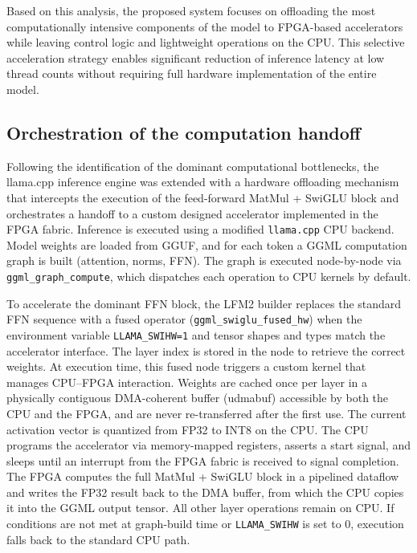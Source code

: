 \documentclass[manuscript,]{acmart} %
\begin{document}
Based on this analysis, the proposed system focuses on offloading the most computationally intensive components of the model to FPGA-based accelerators while leaving control logic and lightweight operations on the CPU. This selective acceleration strategy enables significant reduction of inference latency at low thread counts without requiring full hardware implementation of the entire model. 

\subsection{Orchestration of the computation handoff}
Following the identification of the dominant computational bottlenecks, the llama.cpp inference engine was extended with a hardware offloading mechanism that intercepts the execution of the feed-forward MatMul + SwiGLU block and orchestrates a handoff to a custom designed accelerator implemented in the FPGA fabric.
Inference is executed using a modified \texttt{llama.cpp} CPU backend. Model weights are loaded from GGUF, and for each token a GGML computation graph is built (attention, norms, FFN). The graph is executed node-by-node via \texttt{ggml\_graph\_compute}, which dispatches each operation to CPU kernels by default.

To accelerate the dominant FFN block, the LFM2 builder replaces the standard FFN sequence with a fused operator (\texttt{ggml\_swiglu\_fused\_hw}) when the environment variable \texttt{LLAMA\_SWIHW=1} and tensor shapes and types match the accelerator interface. The layer index is stored in the node to retrieve the correct weights.
At execution time, this fused node triggers a custom kernel that manages CPU–FPGA interaction. Weights are cached once per layer in a physically contiguous DMA-coherent buffer (udmabuf) accessible by both the CPU and the FPGA, and are never re-transferred after the first use. The current activation vector is quantized from FP32 to INT8 on the CPU. %
The CPU programs the accelerator via memory-mapped registers, asserts a start signal, and sleeps until an interrupt from the FPGA fabric is received to signal completion. The FPGA computes the full MatMul + SwiGLU block in a pipelined dataflow and writes the FP32 result back to the DMA buffer, from which the CPU copies it into the GGML output tensor. All other layer operations remain on CPU. If conditions are not met at graph-build time or \texttt{LLAMA\_SWIHW} is set to 0, execution falls back to the standard CPU path.
\end{document}
